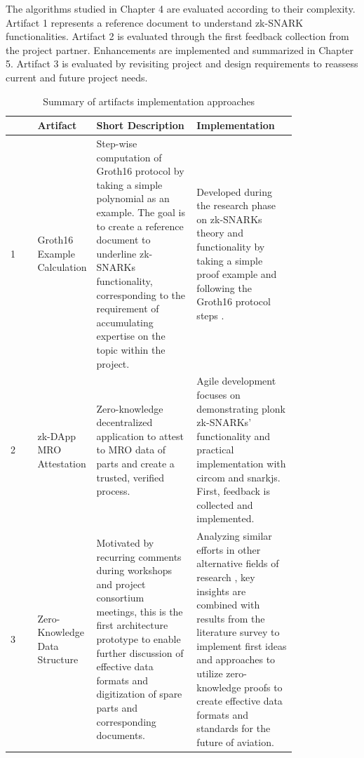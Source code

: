 The algorithms studied in Chapter 4 are evaluated according to their complexity. Artifact 1 represents a reference document to understand zk-SNARK functionalities. Artifact 2 is evaluated through the first feedback collection from the project partner. Enhancements are implemented and summarized in Chapter 5. Artifact 3 is evaluated by revisiting project and design requirements to reassess current and future project needs. 

\setlength{\tabcolsep}{2ex}
\renewcommand{\arraystretch}{1.5}%
\begin{table}[htb]
	\centering
	    \caption{Summary of artifacts implementation approaches}
		\begin{tabular}{|m{0.001\linewidth} | m{0.11\linewidth} | m{0.35\linewidth} | m{0.35\linewidth} |}
		\hline
		\textbf{}& \textbf{Artifact} & \textbf{Short Description} & \textbf{Implementation} \\ \hline
            1&Groth16 Example \newline Calculation & Step-wise computation of Groth16 protocol by taking a simple polynomial as an example. The goal is to create a reference document to underline zk-SNARKs functionality, corresponding to the requirement of accumulating expertise on the topic within the project. & Developed during the research phase on zk-SNARKs theory and functionality by taking a simple proof example and following the Groth16 protocol steps \citep{Groth2016OnTS}. \\  \hline
            2&zk-DApp MRO \newline Attestation & Zero-knowledge decentralized application to attest to MRO data of parts and create a trusted, verified process. & Agile development focuses on demonstrating plonk zk-SNARKs' functionality and practical implementation with circom and snarkjs. First, feedback is collected and implemented. \\ \hline 
            3&Zero-Knowledge Data \newline Structure & Motivated by recurring comments during workshops and project consortium meetings, this is the first architecture prototype to enable further discussion of effective data formats and digitization of spare parts and corresponding documents. & Analyzing similar efforts in other alternative fields of research \citep{sedlemeirgrenenergy}, key insights are combined with results from the literature survey to implement first ideas and approaches to utilize zero-knowledge proofs to create effective data formats and standards for the future of aviation. \\ \hline 
	\end{tabular}
\label{tab:summary_artifacts}
\end{table}
